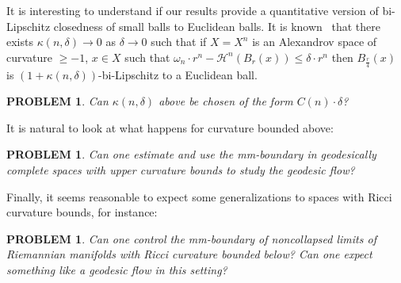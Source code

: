 \documentclass[12pt,leqno,intlimits]{amsart}
\numberwithin{equation}{section}
\newtheorem{quest}[thm]{PROBLEM}
\theoremstyle{definition}
\theoremstyle{remark}
\begin{document}
It is interesting to understand if our results provide a quantitative version of bi-Lipschitz closedness of small balls to Euclidean balls. It is known~\cite{BGP} that there exists $\kappa(n,\delta)\to 0$ as $\delta\to 0$ such that if $X=X^n$ is an Alexandrov space of curvature $\ge -1$, $x\in X$ such that $\omega _n{\cdot}r^n -\mathcal H^n (B_r (x)) \leq \delta \cdot r ^n$ then $B_{\frac r 4} (x)$ is $(1+\kappa(n,\delta))$-bi-Lipschitz to a Euclidean ball.
\begin{quest}
Can $\kappa(n,\delta)$ above be chosen 
of the form $C(n)\cdot \delta$? 
\end{quest}

It is natural to look at what happens for curvature bounded above:

\begin{quest} \label{qe:CAT}
Can one estimate and use the mm-boundary in geodesically complete spaces with upper curvature bounds to study the geodesic flow?
\end{quest}

Finally, it seems reasonable to expect some generalizations to spaces with Ricci curvature bounds, for instance:

\begin{quest}
Can one control the mm-boundary of noncollapsed limits of Riemannian manifolds with Ricci curvature bounded below? Can one expect something like a geodesic flow in this setting?
\end{quest}
\end{document}
